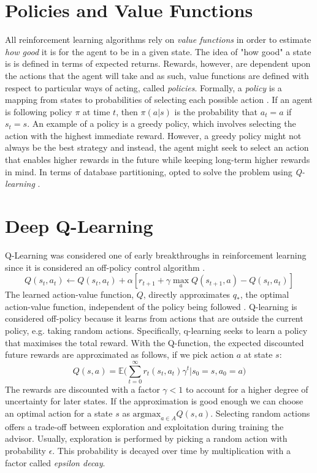 \section{Policies and Value Functions}
All reinforcement learning algorithms rely on \textit{value functions} in order to estimate \textit{how good} it is for the agent to be in a given state. The idea of "how good" a state is is defined in terms of expected returns. Rewards, however, are dependent upon the actions that the agent will take and as such, value functions are defined with respect to particular ways of acting, called \textit{policies}. 
Formally, a \textit{policy} is a mapping from states to probabilities of selecting each possible action \cite{sutton2018reinforcement}. If an agent is following policy $\pi$ at time $t$, then $\pi(a|s)$ is the probability that $a_t=a$ if $s_t=s$. An example of a policy is a greedy policy, which involves selecting the action with the highest immediate reward. However, a greedy policy might not always be the best strategy and instead, the agent might seek to select an action that enables higher rewards in the future while keeping long-term higher rewards in mind. 
In terms of database partitioning, \citeauthor{Hilprecht:2019:TLP:3329859.3329876} opted to solve the problem using \textit{Q-learning} \cite{Hilprecht:2019:TLP:3329859.3329876, DBLP:conf/sigmod/HilprechtBR20}.   

\section{Deep Q-Learning}
\label{sec:q-learning}
Q-Learning was considered one of early breakthroughs in reinforcement learning since it is considered an off-policy control algorithm \cite{watkins1992q}.
\begin{equation}
\label{eq:bellman}
Q(s_t,a_t) \xleftarrow[]{} Q(s_t,a_t) + \alpha[r_{t+1} + \gamma \max_a Q(s_{t+1},a) - Q(s_t,a_t)]
\end{equation}
The learned action-value function, $Q$, directly approximates $q_*$, the optimal action-value function, independent of the policy being followed \cite{sutton2018reinforcement}. Q-learning is considered off-policy because it learns from actions that are outside the current policy, e.g. taking random actions. Specifically, q-learning seeks to learn a policy that maximises the total reward. 
With the Q-function, the expected discounted future rewards are approximated as follows, if we pick action $a$ at state $s$:
\begin{equation}
    Q(s,a) = \mathbb{E}\bigg(\sum^{\infty}_{t=0}r_t(s_t,a_t)\gamma^t|s_0=s,a_0=a \bigg)
\end{equation}
The rewards are discounted with a factor $\gamma < 1$ to account for a higher degree of uncertainty for later states. If the approximation is good enough we can choose an optimal action for a state $s$ as $\text{argmax}_{a \in A} Q(s,a)$. Selecting random actions offers a trade-off between exploration and exploitation during training the advisor. Usually, exploration is performed by picking a random action with probability $\epsilon$. This probability is decayed over time \cite{sutton2018reinforcement} by multiplication with a factor called \textit{epsilon decay}. 

